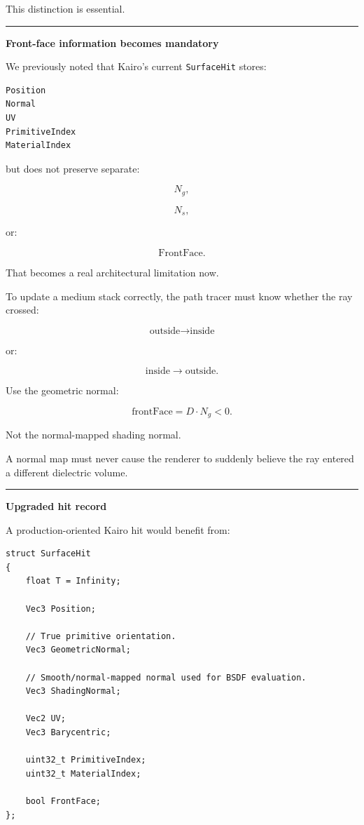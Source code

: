 This distinction is essential.

\begin{center}\rule{0.5\linewidth}{0.5pt}\end{center}

\textbf{Front-face information becomes mandatory}

We previously noted that Kairo's current \texttt{SurfaceHit} stores:

\begin{verbatim}
Position
Normal
UV
PrimitiveIndex
MaterialIndex
\end{verbatim}

but does not preserve separate:

\[
N_g,
\]

\[
N_s,
\]

or:

\[
\text{FrontFace}.
\]

That becomes a real architectural limitation now.

To update a medium stack correctly, the path tracer must know whether the ray crossed:

\[
\text{outside}\rightarrow\text{inside}
\]

or:

\[
\text{inside}\rightarrow\text{outside}.
\]

Use the geometric normal:

\[
\boxed{
\text{frontFace}
=
D\cdot N_g<0.
}
\]

Not the normal-mapped shading normal.

A normal map must never cause the renderer to suddenly believe the ray entered a different dielectric volume.

\begin{center}\rule{0.5\linewidth}{0.5pt}\end{center}

\textbf{Upgraded hit record}

A production-oriented Kairo hit would benefit from:

\begin{verbatim}
struct SurfaceHit
{
    float T = Infinity;

    Vec3 Position;

    // True primitive orientation.
    Vec3 GeometricNormal;

    // Smooth/normal-mapped normal used for BSDF evaluation.
    Vec3 ShadingNormal;

    Vec2 UV;
    Vec3 Barycentric;

    uint32_t PrimitiveIndex;
    uint32_t MaterialIndex;

    bool FrontFace;
};
\end{verbatim}

